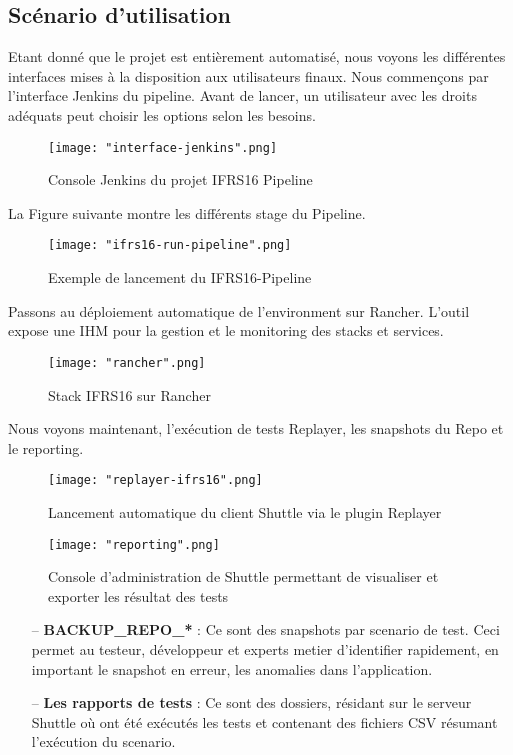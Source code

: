 \begin{spacing}{1.2}
\subsection{Scénario d’utilisation}
Etant donné que le projet est entièrement automatisé, nous voyons les différentes interfaces mises à la disposition aux utilisateurs finaux.
Nous commençons par l’interface Jenkins du pipeline. Avant de lancer, un utilisateur avec les droits adéquats peut choisir les options selon les besoins. 
\begin{figure}[!ht]\centering
\texttt{[image: "interface-jenkins".png]}
\caption{Console Jenkins du projet IFRS16 Pipeline}
\label{fig:fig1}
\end{figure}
\FloatBarrier
La Figure suivante montre les différents stage du Pipeline.
\begin{figure}[!ht]\centering
\texttt{[image: "ifrs16-run-pipeline".png]}
\caption{Exemple de lancement du IFRS16-Pipeline}
\label{fig:fig1}
\end{figure}
\FloatBarrier
\vspace{-3mm}
Passons au déploiement automatique de l'environment sur Rancher. L'outil expose une IHM pour la gestion et le monitoring des stacks et services. 
\begin{figure}[!ht]\centering
\texttt{[image: "rancher".png]}
\caption{Stack IFRS16 sur Rancher}
\label{fig:fig1}
\end{figure}
\FloatBarrier
\vspace{-3mm}
Nous voyons maintenant, l'exécution de tests Replayer, les snapshots du Repo et le reporting. 
\begin{figure}[!ht]\centering
\texttt{[image: "replayer-ifrs16".png]}
\caption{Lancement automatique du client Shuttle via le plugin Replayer}
\label{fig:fig1}
\end{figure}
\begin{figure}[!ht]\centering
\texttt{[image: "reporting".png]}
\caption{Console d'administration de Shuttle permettant de visualiser et exporter les résultat des tests }
\label{fig:fig1}
\end{figure}
\FloatBarrier

\begin{itemize}
\setlength\itemsep{0em}
\item[--] \textbf{BACKUP\_REPO\_*} : Ce sont des snapshots par scenario de test. Ceci permet au testeur, développeur et experts metier d'identifier rapidement, en important le snapshot en erreur, les anomalies dans l'application.
\item[--] \textbf{Les rapports de tests} : Ce sont des dossiers, résidant sur le serveur Shuttle où ont été exécutés les tests et contenant des fichiers CSV résumant l'exécution du scenario.  
\end{itemize}

\end{spacing}
